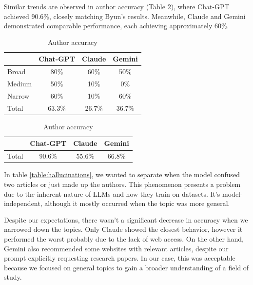 \documentclass[runningheads]{llncs}
\begin{document}
Similar trends are observed in author accuracy (Table \ref{table:author_acc}), where Chat-GPT achieved 90.6\%, closely matching Byun's results. Meanwhile, Claude and Gemini demonstrated comparable performance, each achieving approximately 60\%.

\begin{table}[ht]
    \footnotesize
    \centering
    \begin{minipage}{0.45\textwidth}
        \centering
        \begin{tabular}{ l c c c }
            \hline
             & \textbf{Chat-GPT} & \textbf{Claude} & \textbf{Gemini} \\
            \hline
            Broad & 80\% & 60\% & 50\% \\
            Medium & 50\% & 10\% & 0\% \\
            Narrow & 60\% & 10\% & 60\% \\
            Total & 63.3\% & 26.7\% & 36.7\% \\
            \hline
        \end{tabular}
        \caption{Title accuracy}
        \label{table:title_acc}
    \end{minipage}
    \hfill
    \begin{minipage}{0.45\textwidth}
        \centering
        \begin{tabular}{ l c c c }
            \hline
             & \textbf{Chat-GPT} & \textbf{Claude} & \textbf{Gemini} \\
            \hline
            Total & 90.6\% & 55.6\% & 66.8\% \\
            \hline
        \end{tabular}
        \caption{Author accuracy}
        \label{table:author_acc}
    \end{minipage}
\end{table}

In table \ref{table:hallucinations}, we wanted to separate when the model confused two articles or just made up the authors. This phenomenon presents a problem due to the inherent nature of LLMs and how they train on datasets. It's model-independent, although it mostly occurred when the topic was more general.

Despite our expectations, there wasn't a significant decrease in accuracy when we narrowed down the topics. Only Claude showed the closest behavior, however it performed the worst probably due to the lack of web access. On the other hand, Gemini also recommended some websites with relevant articles, despite our prompt explicitly requesting research papers. In our case, this was acceptable because we focused on general topics to gain a broader understanding of a field of study.
\end{document}
